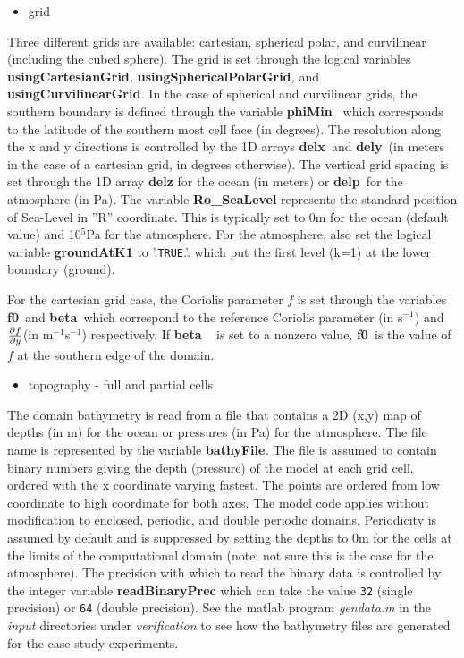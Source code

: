 \begin{itemize}
\item grid
\end{itemize}

Three different grids are available: cartesian, spherical polar, and
curvilinear (including the cubed sphere). The grid is set through the
logical variables \textbf{usingCartesianGrid}\textit{, }\textbf{%
usingSphericalPolarGrid}\textit{, }and \textit{\ }\textbf{%
usingCurvilinearGrid}\textit{. }In the case of spherical and curvilinear
grids, the southern boundary is defined through the variable \textbf{phiMin}%
\textit{\ }which corresponds to the latitude of the southern most cell face
(in degrees). The resolution along the x and y directions is controlled by
the 1D arrays \textbf{delx}\textit{\ }and \textbf{dely}\textit{\ }(in meters
in the case of a cartesian grid, in degrees otherwise). The vertical grid
spacing is set through the 1D array \textbf{delz }for the ocean (in meters)
or \textbf{delp}\textit{\ }for the atmosphere (in Pa). The variable \textbf{%
Ro\_SeaLevel} represents the standard position of Sea-Level in ''R''
coordinate. This is typically set to 0m for the ocean (default value) and 10$%
^{5}$Pa for the atmosphere. For the atmosphere, also set the logical
variable \textbf{groundAtK1} to '.\texttt{TRUE}.'. which put the first level
(k=1) at the lower boundary (ground).

For the cartesian grid case, the Coriolis parameter $f$ is set through the
variables \textbf{f0}\textit{\ }and \textbf{beta}\textit{\ }which correspond
to the reference Coriolis parameter (in s$^{-1}$) and $\frac{\partial f}{%
\partial y}$(in m$^{-1}$s$^{-1}$) respectively. If \textbf{beta }\textit{\ }%
is set to a nonzero value, \textbf{f0}\textit{\ }is the value of $f$ at the
southern edge of the domain.

\begin{itemize}
\item topography - full and partial cells
\end{itemize}

The domain bathymetry is read from a file that contains a 2D (x,y) map of
depths (in m) for the ocean or pressures (in Pa) for the atmosphere. The
file name is represented by the variable \textbf{bathyFile}\textit{. }The
file is assumed to contain binary numbers giving the depth (pressure) of the
model at each grid cell, ordered with the x coordinate varying fastest. The
points are ordered from low coordinate to high coordinate for both axes. The
model code applies without modification to enclosed, periodic, and double
periodic domains. Periodicity is assumed by default and is suppressed by
setting the depths to 0m for the cells at the limits of the computational
domain (note: not sure this is the case for the atmosphere). The precision
with which to read the binary data is controlled by the integer variable 
\textbf{readBinaryPrec }which can take the value \texttt{32} (single
precision) or \texttt{64} (double precision). See the matlab program \textit{%
gendata.m }in the \textit{input }directories under \textit{verification }to
see how the bathymetry files are generated for the case study experiments.

